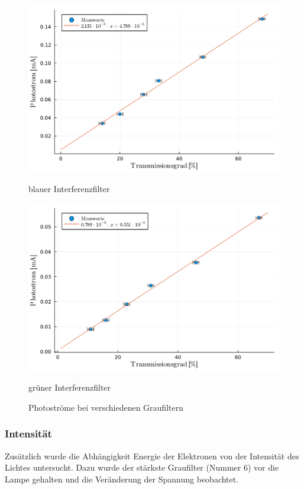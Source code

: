 \documentclass[12pt,a4paper]{scrartcl}
\numberwithin{equation}{section} %
\begin{document}
\begin{figure}[h!]
	\begin{minipage}{0.5\textwidth}
		\includegraphics[width=\textwidth]{../media/B1.4/Photostrom_blau.pdf}
		\caption*{blauer Interferenzfilter}
		\label{abb:Photostrom blau}
	\end{minipage}
	\begin{minipage}{0.5\textwidth}
		\includegraphics[width=\textwidth]{../media/B1.4/Photostrom_gruen.pdf}
		\caption*{grüner Interferenzfilter}
		\label{abb:Photostrom grün}
	\end{minipage}
	\caption{Photoströme bei verschiedenen Graufiltern}
	\label{abb:Photostrom fit}
\end{figure}

\subsubsection{Intensität}
Zusätzlich wurde die Abhängigkeit Energie der Elektronen von der Intensität des Lichtes untersucht. Dazu wurde der stärkste Graufilter (Nummer $6$) vor die Lampe gehalten und die Veränderung der Spannung beobachtet.
\end{document}

